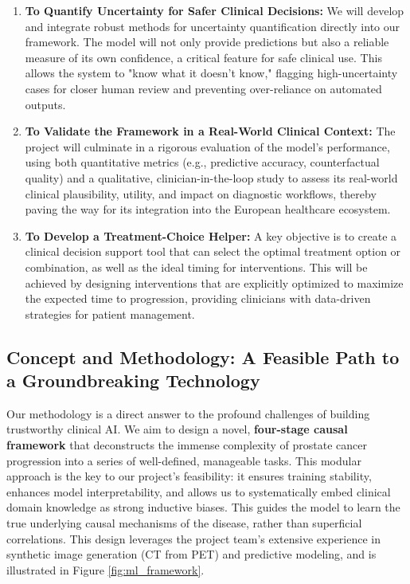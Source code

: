 \documentclass[11pt, a4paper]{article}
\begin{document}
\begin{enumerate}
    \item \textbf{To Quantify Uncertainty for Safer Clinical Decisions:} We will develop and integrate robust methods for uncertainty quantification directly into our framework. The model will not only provide predictions but also a reliable measure of its own confidence, a critical feature for safe clinical use. This allows the system to "know what it doesn't know," flagging high-uncertainty cases for closer human review and preventing over-reliance on automated outputs.
    \item \textbf{To Validate the Framework in a Real-World Clinical Context:} The project will culminate in a rigorous evaluation of the model's performance, using both quantitative metrics (e.g., predictive accuracy, counterfactual quality) and a qualitative, clinician-in-the-loop study to assess its real-world clinical plausibility, utility, and impact on diagnostic workflows, thereby paving the way for its integration into the European healthcare ecosystem.
    \item \textbf{To Develop a Treatment-Choice Helper:} A key objective is to create a clinical decision support tool that can select the optimal treatment option or combination, as well as the ideal timing for interventions. This will be achieved by designing interventions that are explicitly optimized to maximize the expected time to progression, providing clinicians with data-driven strategies for patient management.

    
\end{enumerate}

\subsection{Concept and Methodology: A Feasible Path to a Groundbreaking Technology}
Our methodology is a direct answer to the profound challenges of building trustworthy clinical AI. We aim to design a novel, \textbf{four-stage causal framework} that deconstructs the immense complexity of prostate cancer progression into a series of well-defined, manageable tasks. This modular approach is the key to our project's feasibility: it ensures training stability, enhances model interpretability, and allows us to systematically embed clinical domain knowledge as strong inductive biases. This guides the model to learn the true underlying causal mechanisms of the disease, rather than superficial correlations. This design leverages the project team's extensive experience in synthetic image generation (CT from PET) and predictive modeling, and is illustrated in Figure \ref{fig:ml_framework}.
\end{document}
